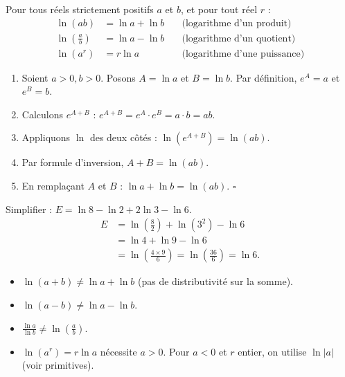 \documentclass[11pt]{article}
\providecommand{\qed}{\hfill$\square$}
\begin{document}
\begin{propriete}
Pour tous réels strictement positifs $a$ et $b$, et pour tout réel $r$ :
\begin{align*}
    \ln(ab) &= \ln a + \ln b \quad &\text{(logarithme d'un produit)} \\
    \ln\left(\frac{a}{b}\right) &= \ln a - \ln b \quad &\text{(logarithme d'un quotient)} \\
    \ln(a^r) &= r \ln a \quad &\text{(logarithme d'une puissance)}
\end{align*}
\end{propriete}

\begin{experience}[Démonstration guidée de $\ln(ab) = \ln a + \ln b$]
\begin{enumerate}
    \item Soient $a>0, b>0$. Posons $A = \ln a$ et $B = \ln b$. Par définition, $e^A = a$ et $e^B = b$.
    \item Calculons $e^{A+B}$ : $e^{A+B} = e^A \cdot e^B = a \cdot b = ab$.
    \item Appliquons $\ln$ des deux côtés : $\ln(e^{A+B}) = \ln(ab)$.
    \item Par formule d'inversion, $A+B = \ln(ab)$.
    \item En remplaçant $A$ et $B$ : $\ln a + \ln b = \ln(ab)$. \qed
\end{enumerate}
\end{experience}

\begin{exemplebox}
Simplifier : $E = \ln 8 - \ln 2 + 2\ln 3 - \ln 6$.
\begin{align*}
    E &= \ln\left(\frac{8}{2}\right) + \ln(3^2) - \ln 6 \\
      &= \ln 4 + \ln 9 - \ln 6 \\
      &= \ln\left(\frac{4 \times 9}{6}\right) = \ln\left(\frac{36}{6}\right) = \ln 6.
\end{align*}
\end{exemplebox}

\begin{attention}
\begin{itemize}
    \item $\ln(a+b) \neq \ln a + \ln b$ (pas de distributivité sur la somme).
    \item $\ln(a-b) \neq \ln a - \ln b$.
    \item $\frac{\ln a}{\ln b} \neq \ln\left(\frac{a}{b}\right)$.
    \item $\ln(a^r) = r\ln a$ nécessite $a>0$. Pour $a<0$ et $r$ entier, on utilise $\ln|a|$ (voir primitives).
\end{itemize}
\end{attention}
\end{document}
